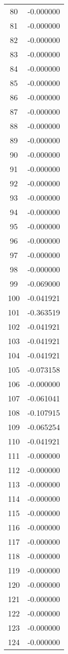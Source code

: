 \documentclass[12pt]{article}
\begin{document}
\begin{longtable}{@{}cc@{}}
80 & -0.000000 \\
81 & -0.000000 \\
82 & -0.000000 \\
83 & -0.000000 \\
84 & -0.000000 \\
85 & -0.000000 \\
86 & -0.000000 \\
87 & -0.000000 \\
88 & -0.000000 \\
89 & -0.000000 \\
90 & -0.000000 \\
91 & -0.000000 \\
92 & -0.000000 \\
93 & -0.000000 \\
94 & -0.000000 \\
95 & -0.000000 \\
96 & -0.000000 \\
97 & -0.000000 \\
98 & -0.000000 \\
99 & -0.069000 \\
100 & -0.041921 \\
101 & -0.363519 \\
102 & -0.041921 \\
103 & -0.041921 \\
104 & -0.041921 \\
105 & -0.073158 \\
106 & -0.000000 \\
107 & -0.061041 \\
108 & -0.107915 \\
109 & -0.065254 \\
110 & -0.041921 \\
111 & -0.000000 \\
112 & -0.000000 \\
113 & -0.000000 \\
114 & -0.000000 \\
115 & -0.000000 \\
116 & -0.000000 \\
117 & -0.000000 \\
118 & -0.000000 \\
119 & -0.000000 \\
120 & -0.000000 \\
121 & -0.000000 \\
122 & -0.000000 \\
123 & -0.000000 \\
124 & -0.000000 \\

\end{longtable}
\end{document}
